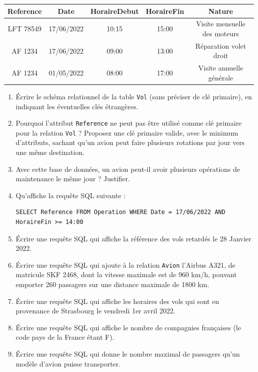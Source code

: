 \documentclass[11pt,a4paper,french,twoside]{PMCours}
\begin{document}
\begin{itemize}
\begin{center}
\begin{tabular}{|c|c|c|c|c|}\hline
Reference & Date & HoraireDebut & HoraireFin & Nature\\\hline
LFT 78549 & 17/06/2022 & 10:15 & 15:00 & Visite mensuelle des moteurs\\\hline
AF 1234 & 17/06/2022 & 09:00 & 13:00 & Réparation volet droit\\\hline
AF 1234 & 01/05/2022 & 08:00 & 17:00 & Visite annuelle générale\\\hline
\end{tabular}
\end{center}
\end{itemize}

\begin{enumerate}
\item Écrire le schéma relationnel de la table \verb'Vol' (sans préciser de clé primaire), en indiquant les éventuelles clés étrangères.
\item Pourquoi l'attribut \verb'Reference' ne peut pas être utilisé comme clé primaire pour la relation \verb'Vol' ? Proposez une clé primaire valide, avec le minimum d'attributs, sachant qu'un avion peut faire plusieurs rotations par jour vers une même destination.
\item Avec cette base de données, un avion peut-il avoir plusieurs opérations de maintenance le même jour ? Justifier.
\item Qu'affiche la requête SQL suivante :
\begin{verbatim}
SELECT Reference FROM Operation WHERE Date = 17/06/2022 AND HoraireFin >= 14:00
\end{verbatim} 
\item Écrire une requête SQL qui affiche la référence des vols retardés le 28 Janvier 2022.
\item Écrire une requête SQL qui ajoute à la relation \verb'Avion' l'Airbus A321, de matricule SKF 2468, dont la vitesse maximale est de 960 km/h, pouvant emporter 260 passagers sur une distance maximale de 1800 km.
\item Écrire une requête SQL qui affiche les horaires des vols qui sont en provenance de Strasbourg le vendredi 1er avril 2022.
\item Écrire une requête SQL qui affiche le nombre de compagnies françaises (le code pays de la France étant F).
\item Écrire une requête SQL qui donne le nombre maximal de passagers qu'un modèle d'avion puisse transporter.\\

\end{enumerate}
\end{document}
